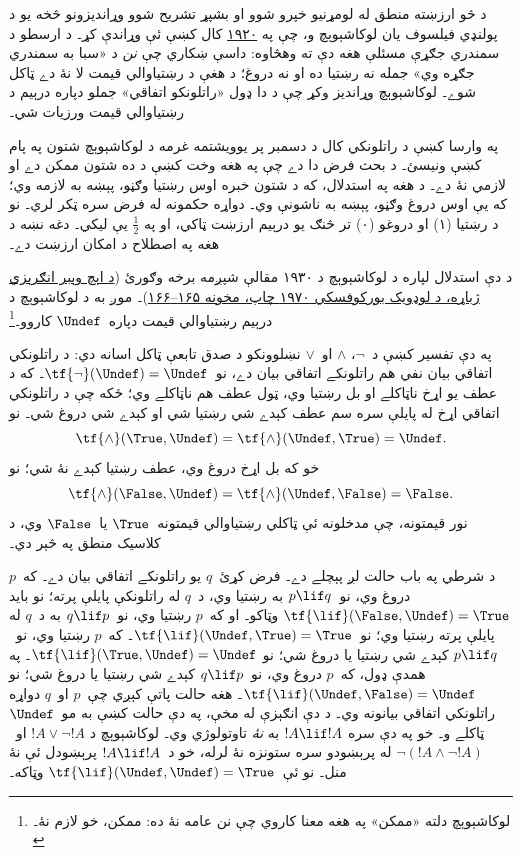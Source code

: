 \documentclass[../../../include/open-logic-section]{subfiles}
\begin{document}


د څو ارزښته منطق له لومړنيو خپرو شوو او بشپړ تشريح شوو وړانديزونو
څخه يو د پولنډي فيلسوف يان لوکاشېوېچ و، چې په \href{https://kpbc.umk.pl/Content/247342/PDF/EOD_OPEN_006_12_nr_09.pdf}{۱۹۲۰} کال کښې ئې
وړاندې کړ۔ د ارسطو د سمندري جګړې مسئلې هغه دې ته وهڅاوه: داسې
ښکاري چې \emph{نن} د «سبا به سمندري جګړه وي» جمله نه رښتيا ده
او نه دروغ؛ د هغې د رښتياوالي قيمت لا نۀ دے ټاکل شوے۔ لوکاشېوېچ
وړانديز وکړ چې د دا ډول «راتلونکو اتفاقي» جملو دپاره درېيم
د رښتياوالي قيمت ورزيات شي۔
\begin{explain}
په وارسا کښې د راتلونکي کال د دسمبر پر يوويشتمه غرمه د
لوکاشېوېچ شتون په پام کښې ونيسئ۔ د بحث فرض دا دے چې په هغه
وخت کښې د ده شتون ممکن دے او لازمي نۀ دے۔ د هغه په استدلال،
که د شتون خبره اوس رښتيا وګڼو، پېښه به لازمه وي؛ که يې اوس
دروغ وګڼو، پېښه به ناشونې وي۔ دواړه حکمونه له فرض سره ټکر لري۔
نو د رښتيا (۱) او دروغو (۰) تر څنګ يو درېيم ارزښت ټاکي، او
په $\frac{1}{2}$ يې ليکي۔ دغه نښه د هغه په اصطلاح د امکان
ارزښت دے۔
\end{explain}
د دې استدلال لپاره د لوکاشېوېچ د ۱۹۳۰ مقالې شپږمه برخه وګورئ (\href{https://ci.nii.ac.jp/ncid/BA03950054}{د اېچ وېبر انګرېزي ژباړه، د لوډويک بورکوفسکي ۱۹۷۰ چاپ، مخونه ۱۶۵–۱۶۶})۔
موږ به د لوکاشېوېچ د درېيم رښتياوالي قيمت دپاره~$\Undef$
کاروو۔\footnote{لوکاشېوېچ دلته «ممکن» په هغه معنا کاروي چې نن
عامه نۀ ده: ممکن، خو لازم نۀ۔}

په دې تفسير کښې د~$\lnot$، $\land$ او~$\lor$ نښلوونکو
د صدق تابعې ټاکل اسانه دي: د راتلونکي اتفاقي بيان نفي هم
راتلونکے اتفاقي بيان دے، نو~$\tf{\lnot}(\Undef) = \Undef$۔
که د عطف يو اړخ ناټاکلے او بل رښتيا وي، ټول عطف هم ناټاکلے
وي؛ ځکه چې د راتلونکي اتفاقي اړخ له پايلې سره سم عطف کېدے شي
رښتيا شي او کېدے شي دروغ شي۔ نو \[
    \tf{\land}(\True, \Undef) =
\tf{\land}(\Undef, \True) =
\Undef.
\]
خو که بل اړخ دروغ وي، عطف رښتيا کېدے نۀ شي؛ نو
\[\tf{\land}(\False, \Undef) =
\tf{\land}(\Undef, \False) = \False.\]
نور قيمتونه، چې مدخلونه ئې ټاکلي رښتياوالي قيمتونه~$\True$
يا~$\False$ وي، د کلاسيک منطق په څېر دي۔

د شرطي په باب حالت لږ پېچلے دے۔ فرض کړئ~$q$ يو راتلونکے
اتفاقي بيان دے۔ که~$p$ دروغ وي، نو~$p \lif q$ به رښتيا وي،
د~$q$ له راتلونکې پايلې پرته؛ نو بايد
$\tf{\lif}(\False, \Undef) = \True$ وټاکو۔ او که~$p$
رښتيا وي، نو~$q \lif p$ به د~$q$ له پايلې پرته رښتيا وي؛
نو~$\tf{\lif}(\Undef, \True) = \True$۔ که~$p$ رښتيا
وي، نو~$p \lif q$ کېدے شي رښتيا يا دروغ شي؛ نو
$\tf{\lif}(\True, \Undef) = \Undef$۔ په همدې ډول، که~$p$
دروغ وي، نو~$q \lif p$ کېدے شي رښتيا يا دروغ شي؛ نو
$\tf{\lif}(\Undef, \False) = \Undef$۔ هغه حالت پاتې کېږي
چې~$p$ او~$q$ دواړه راتلونکي اتفاقي بيانونه وي۔ د دې انګېزې
له مخې، په دې حالت کښې به مو~$\Undef$ ټاکلے و۔ خو په دې سره
$!A \lif !A$ به \emph{نۀ} تاوتولوژي وي۔ لوکاشېوېچ د
$!A \lor \lnot !A$ او~$\lnot(!A \land \lnot !A)$ له پرېښودو
سره ستونزه نۀ لرله، خو د~$!A \lif !A$ پرېښودل ئې نۀ منل۔
نو ئې~$\tf{\lif}(\Undef, \Undef) = \True$ وټاکه۔
\end{document}
